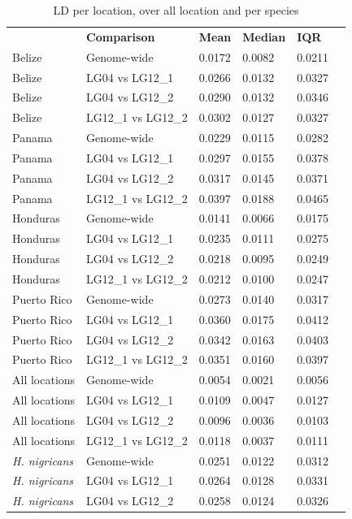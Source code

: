 \begin{xltabular}{\textwidth}{p{5cm}*{2}{l}*{3}{X}}
\label{tab:s6}
\captionsetup{justification=justified}
\caption{LD per location, over all location and per species}\\
\hline
& \textbf{Comparison} & \textbf{Mean} & \textbf{Median} & \textbf{IQR} \\
\hline \hline
Belize & Genome-wide & 0.0172 & 0.0082 & 0.0211\\
Belize & LG04 vs LG12\_1 & 0.0266 & 0.0132 & 0.0327\\
Belize & LG04 vs LG12\_2 & 0.0290 & 0.0132 & 0.0346\\
Belize & LG12\_1 vs LG12\_2 & 0.0302 & 0.0127 & 0.0327\\
\addlinespace
Panama & Genome-wide & 0.0229 & 0.0115 & 0.0282\\
Panama & LG04 vs LG12\_1 & 0.0297 & 0.0155 & 0.0378\\
Panama & LG04 vs LG12\_2 & 0.0317 & 0.0145 & 0.0371\\
Panama & LG12\_1 vs LG12\_2 & 0.0397 & 0.0188 & 0.0465\\
\addlinespace
Honduras & Genome-wide & 0.0141 & 0.0066 & 0.0175\\
Honduras & LG04 vs LG12\_1 & 0.0235 & 0.0111 & 0.0275\\
Honduras & LG04 vs LG12\_2 & 0.0218 & 0.0095 & 0.0249\\
Honduras & LG12\_1 vs LG12\_2 & 0.0212 & 0.0100 & 0.0247\\
\addlinespace
Puerto Rico & Genome-wide & 0.0273 & 0.0140 & 0.0317\\
Puerto Rico & LG04 vs LG12\_1 & 0.0360 & 0.0175 & 0.0412\\
Puerto Rico & LG04 vs LG12\_2 & 0.0342 & 0.0163 & 0.0403\\
Puerto Rico & LG12\_1 vs LG12\_2 & 0.0351 & 0.0160 & 0.0397\\
\addlinespace
All locations & Genome-wide & 0.0054 & 0.0021 & 0.0056\\
All locations & LG04 vs LG12\_1 & 0.0109 & 0.0047 & 0.0127\\
All locations & LG04 vs LG12\_2 & 0.0096 & 0.0036 & 0.0103\\
All locations & LG12\_1 vs LG12\_2 & 0.0118 & 0.0037 & 0.0111\\
\addlinespace
\textit{H. nigricans} & Genome-wide & 0.0251 & 0.0122 & 0.0312\\
\textit{H. nigricans} & LG04 vs LG12\_1 & 0.0264 & 0.0128 & 0.0331\\
\textit{H. nigricans} & LG04 vs LG12\_2 & 0.0258 & 0.0124 & 0.0326\\

\end{xltabular}
